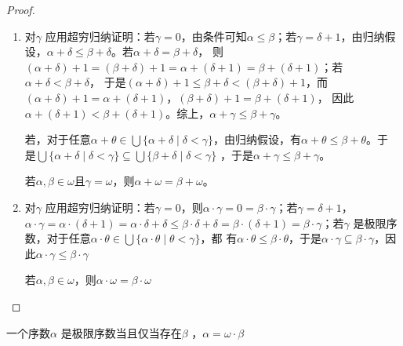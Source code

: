 \documentclass[11pt]{article}
\begin{document}
\begin{proof}
\begin{enumerate}
\item 对\(\gamma\) 应用超穷归纳证明：若\(\gamma=0\)，由条件可知\(\alpha\le\beta\)；若\(\gamma=\delta+1\)，由归纳假设，\(\alpha+\delta\le\beta+\delta\)。若\(\alpha+\delta=\beta+\delta\)，
则\((\alpha+\delta)+1=(\beta+\delta)+1=\alpha+(\delta+1)=\beta+(\delta+1)\)；若\(\alpha+\delta<\beta+\delta\)，
于是\((\alpha+\delta)+1\le\beta+\delta<(\beta+\delta)+1\)，而\((\alpha+\delta)+1=\alpha+(\delta+1)\)，\((\beta+\delta)+1=\beta+(\delta+1)\)，
因此\(\alpha+(\delta+1)<\beta+(\delta+1)\)。综上，\(\alpha+\gamma\le\beta+\gamma\)。

若，对于任意\(\alpha+\theta\in\bigcup\{\alpha+\delta\mid\delta<\gamma\}\)，由归纳假设，有\(\alpha+\theta\le\beta+\theta\)。于
是\(\bigcup\{\alpha+\delta\mid\delta<\gamma\}\subseteq\bigcup\{\beta+\delta\mid\delta<\gamma\}\) ，于是\(\alpha+\gamma\le\beta+\gamma\)。

若\(\alpha,\beta\in\omega\)且\(\gamma=\omega\)，则\(\alpha+\omega=\beta+\omega\)。

\item 对\(\gamma\) 应用超穷归纳证明：若\(\gamma=0\)，则\(\alpha\cdot\gamma=0=\beta\cdot\gamma\)；若\(\gamma=\delta+1\)，
 \(\alpha\cdot\gamma=\alpha\cdot(\delta+1)=\alpha\cdot\delta+\delta\le\beta\cdot\delta+\delta=\beta\cdot(\delta+1)=\beta\cdot\gamma\)；若\(\gamma\)
 是极限序数，对于任意\(\alpha\cdot\theta\in\bigcup\{\alpha\cdot\theta\mid\theta<\gamma\}\)，都
有\(\alpha\cdot\theta\le\beta\cdot\theta\)，于是\(\alpha\cdot\gamma\subseteq\beta\cdot\gamma\)，因此\(\alpha\cdot\gamma\le\beta\cdot\gamma\)

若\(\alpha,\beta\in\omega\)，则\(\alpha\cdot\omega=\beta\cdot\omega\)
\end{enumerate}
\end{proof}

\begin{exercise}[1.5.31]
一个序数\(\alpha\) 是极限序数当且仅当存在\(\beta\) ，\(\alpha=\omega\cdot\beta\)
\end{exercise}
\end{document}
